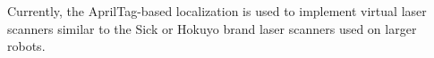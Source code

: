 


Currently, the AprilTag-based localization is used to implement virtual laser scanners similar to the Sick or Hokuyo brand laser scanners used on larger robots. 


